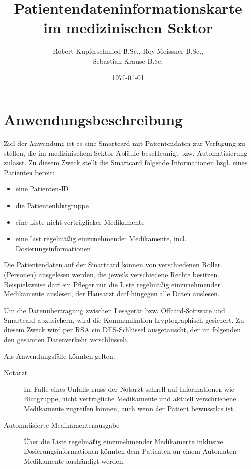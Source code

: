 \documentclass[parskip]{scrartcl}
\begin{document}
	\subject{Projektdokumentation im Modul Smartcard}
	\title{Patientendateninformationskarte im medizinischen Sektor}
	\author{Robert Kupferschmied B.Sc., Roy Meissner B.Sc.,\\Sebastian Krause B.Sc.}
	\date{\today}
	
	\maketitle
	
	\onehalfspacing
	\section{Anwendungsbeschreibung}
		Ziel der Anwendung ist es eine Smartcard mit Patientendaten zur Verfügung zu stellen, die im medizinischem Sektor Abläufe beschleunigt bzw. Automatisierung zulässt. Zu diesem Zweck stellt die Smartcard folgende Informationen bzgl. eines Patienten bereit:
		
		\begin{itemize}
			\item eine Patienten-ID
			\item die Patientenblutgruppe
			\item eine Liste nicht verträglicher Medikamente
			\item eine List regelmäßig einzunehmender Medikamente, incl. Dosierungsinformationen
		\end{itemize}
		
		Die Patientendaten auf der Smartcard können von verschiedenen Rollen (Personen) ausgelesen werden, die jeweils verschiedene Rechte besitzen. Beispielsweise darf ein Pfleger nur die Liste regelmäßig einzunehmender Medikamente auslesen, der Hausarzt darf hingegen alle Daten auslesen.
		
		Um die Datenübertragung zwischen Lesegerät bzw. Offcard-Software und Smartcard abzusichern, wird die Kommunikation kryptographisch gesichert. Zu diesem Zweck wird per RSA ein DES-Schlüssel ausgetauscht, der im folgenden den gesamten Datenverkehr verschlüsselt.
				
		Als Anwendungsfälle könnten gelten:
	
		\begin{description}
			\item[Notarzt] Im Falle eines Unfalls muss der Notarzt schnell auf Informationen wie Blutgruppe, nicht verträgliche Medikamente und aktuell verschriebene Medikamente zugreifen können, auch wenn der Patient bewusstlos ist. 
			\item[Automatisierte Medikamentenausgabe] Über die Liste regelmäßig einzunehmender Me\-dikamente inklusive Dosierungsinformationen könnten dem Patienten an einem Automaten Medikamente aushändigt werden.
		\end{description}
\end{document}
